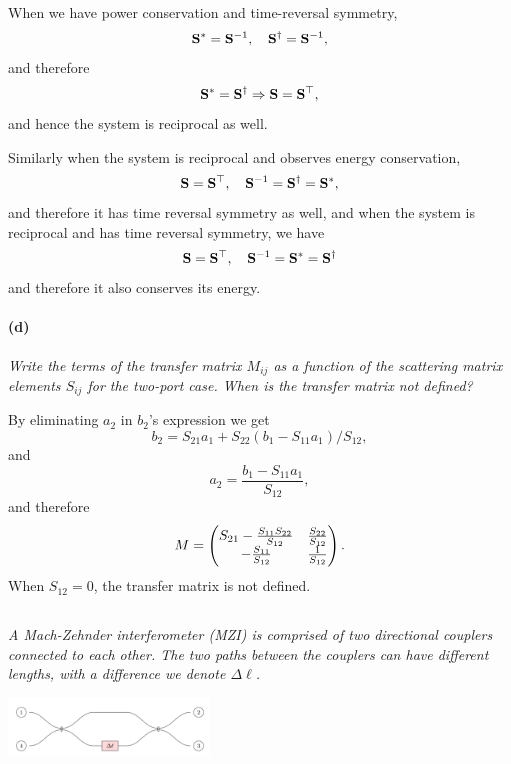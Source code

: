 \documentclass[hyperref, a4paper]{article}
\begin{document}
When we have power conservation and time-reversal symmetry, 
\[
    \vb{S}^* = \vb{S}^{-1}, \quad \vb{S}^\dagger = \vb{S}^{-1},
\]
and therefore 
\begin{equation}
    \vb{S}^* = \vb{S}^\dagger \Rightarrow \vb{S} = \vb{S}^\top,
\end{equation}
and hence the system is reciprocal as well.

Similarly  when the system is reciprocal and observes energy conservation, 
\[
    \vb{S} = \vb{S}^\top, \quad \vb{S}^{-1} = \vb{S}^\dagger = \vb{S}^*, 
\]
and therefore it has time reversal symmetry as well, 
and when the system is reciprocal and has time reversal symmetry, we have 
\[
    \vb{S} = \vb{S}^\top, \quad \vb{S}^{-1} = \vb{S}^* = \vb{S}^\dagger
\]
and therefore it also conserves its energy.

\paragraph*{(d)} \textit{Write the terms of the transfer matrix $M_{i j}$ as a function of the scattering matrix elements $S_{i j}$ for the two-port case. When is the transfer matrix not defined?} 

By eliminating $a_2$ in $b_2$'s expression we get 
\[
    b_2 = S_{21} a_1 + S_{22} (b_1 - S_{11} a_1) / S_{12},
\]
and 
\[
    a_2 = \frac{b_1 - S_{11} a_1}{S_{12}},
\]
and therefore 
\begin{equation}
    M = \pmqty{
        S_{21} - \frac{S_{11} S_{22}}{S_{12}}  & \frac{S_{22}}{S_{12}} \\
        - \frac{S_{11}}{S_{12}} & \frac{1}{S_{12}} \\
    }.
\end{equation}
When $S_{12} = 0$, the transfer matrix is not defined.

\subsection{}

\subsection{}

\textit{A Mach-Zehnder interferometer (MZI) is comprised of two directional couplers connected to each other. The two paths between the couplers can have different lengths, with a difference we denote $\Delta \ell$.}

\begin{center}
    \includegraphics[width=0.4\textwidth]{figs/Mach-Zehnde.PNG}
\end{center}
\end{document}
